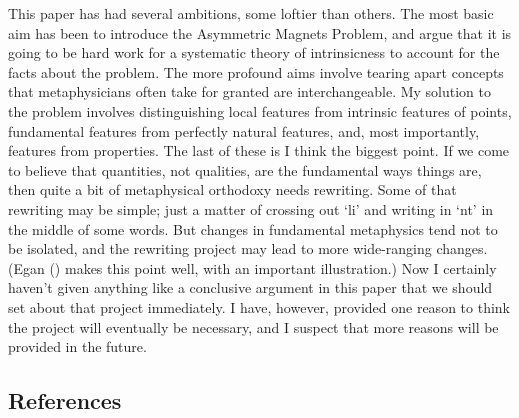 \documentclass[
  10pt,
  letterpaper,
  DIV=11,
  numbers=noendperiod,
  twoside]{scrartcl}
\begin{document}
This paper has had several ambitions, some loftier than others. The most
basic aim has been to introduce the Asymmetric Magnets Problem, and
argue that it is going to be hard work for a systematic theory of
intrinsicness to account for the facts about the problem. The more
profound aims involve tearing apart concepts that metaphysicians often
take for granted are interchangeable. My solution to the problem
involves distinguishing local features from intrinsic features of
points, fundamental features from perfectly natural features, and, most
importantly, features from properties. The last of these is I think the
biggest point. If we come to believe that quantities, not qualities, are
the fundamental ways things are, then quite a bit of metaphysical
orthodoxy needs rewriting. Some of that rewriting may be simple; just a
matter of crossing out `li' and writing in `nt' in the middle of some
words. But changes in fundamental metaphysics tend not to be isolated,
and the rewriting project may lead to more wide-ranging changes. (Egan
() makes this point well, with an
important illustration.) Now I certainly haven't given anything like a
conclusive argument in this paper that we should set about that project
immediately. I have, however, provided one reason to think the project
will eventually be necessary, and I suspect that more reasons will be
provided in the future.

\subsection*{References}\label{references}
\end{document}
